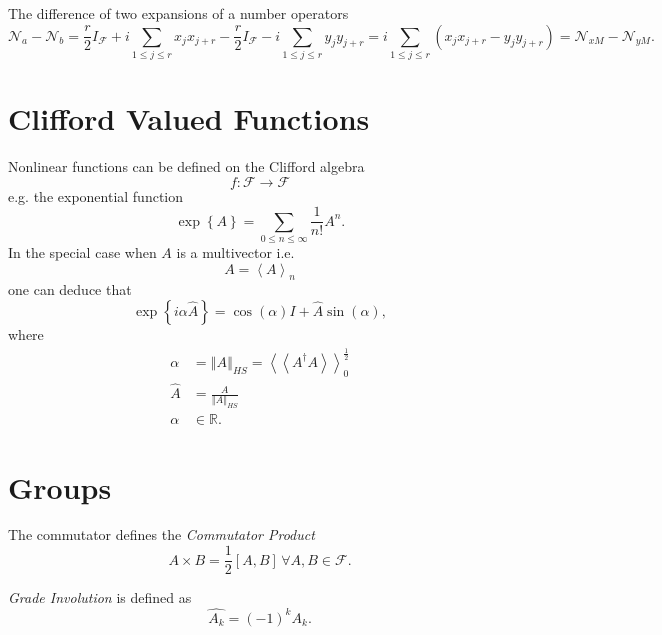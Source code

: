 \documentclass[aps,preprint]{revtex4}%
\begin{document}
The difference of two expansions of a number operators
\begin{equation}
\mathcal{N}_{a}-\mathcal{N}_{b}=\frac{r}{2}I_{\mathcal{F}}+i\sum_{1\leq j\leq
r}x_{j}x_{j+r}-\frac{r}{2}I_{\mathcal{F}}-i\sum_{1\leq j\leq r}y_{j}%
y_{j+r}=i\sum_{1\leq j\leq r}\left(  x_{j}x_{j+r}-y_{j}y_{j+r}\right)
=\mathcal{N}_{xM}-\mathcal{N}_{yM}.
\end{equation}


\section{Clifford Valued Functions}

Nonlinear functions can be defined on the Clifford algebra
\begin{equation}
f:\mathcal{F}\longrightarrow\mathcal{F}%
\end{equation}
e.g. the exponential function
\begin{equation}
\exp\left\{  A\right\}  =\sum_{0\leq n\leq\infty}\frac{1}{n!}A^{n}.
\end{equation}
In the special case when $A$ is a multivector i.e.
\begin{equation}
A=\left\langle A\right\rangle _{n}%
\end{equation}
one can deduce that
\begin{equation}
\exp\left\{  i\alpha\hat{A}\right\}  =\cos\left(  \alpha\right)  I+\hat{A}%
\sin\left(  \alpha\right)  ,
\end{equation}
where
\begin{align}
\alpha &  =\left\Vert A\right\Vert _{HS}=\left\langle \left\langle A^{\dagger
}A\right\rangle \right\rangle _{0}^{\frac{1}{2}}\\
\hat{A}  &  =\frac{A}{\left\Vert A\right\Vert _{HS}}\\
\alpha &  \in\mathbb{R}.
\end{align}


\section{Groups}

The commutator defines the \emph{Commutator Product}
\begin{equation}
A\times B=\frac{1}{2}\left[  A,B\right]  \,\forall A,B\in\mathcal{F}.
\end{equation}


\emph{Grade Involution} is defined as
\begin{equation}
\widehat{A_{k}}=\left(  -1\right)  ^{k}A_{k}.
\end{equation}
\end{document}
